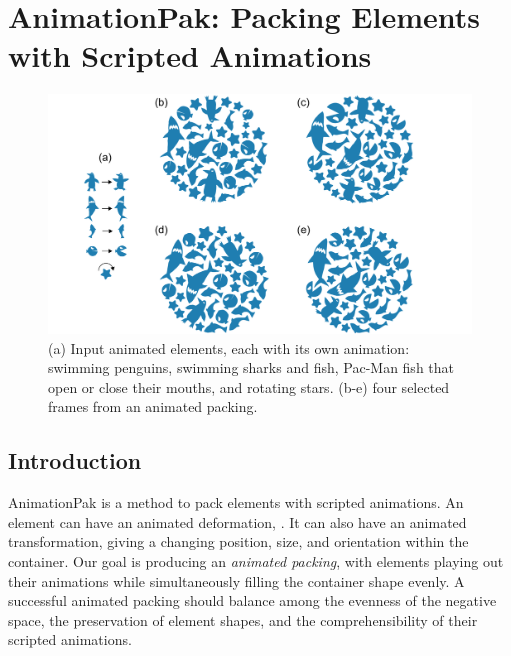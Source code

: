 \chapter{AnimationPak: Packing Elements with Scripted Animations}
\label{chapter_animationpak}

\begin{figure}[h!]
  \centering
  \vspace{-40pt}
  \includegraphics[width=1.0\textwidth]{figures/animationpak/teaser.pdf}
  \caption[An animated packing of aquatic fauna]
  {\label{fig_animationpak_teaser}
  (a) Input animated elements,
  each with its own animation: swimming penguins, swimming sharks and fish,
  Pac-Man fish that open or close their mouths, and rotating stars. 
  (b-e) four selected frames from an animated packing.  
  }
\end{figure}



\section{Introduction}
\label{animationpak_introduction}


AnimationPak is a method to pack elements with scripted animations.
An element can have an animated deformation, .
It can also have an animated transformation, giving a changing
position, size, and orientation within the container.
Our goal is producing an \textit{animated packing}, with elements
playing out their animations while simultaneously filling the
container shape evenly.  A successful animated packing should balance
among the evenness of the negative space, the preservation of 
element shapes, and the comprehensibility of their scripted animations.

